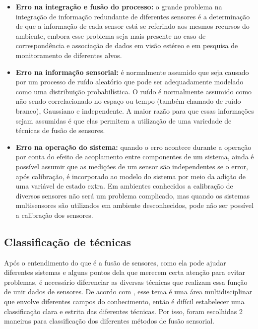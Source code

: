 \documentclass[acronym, symbols]{fei}
\begin{document}
			\begin{itemize}
				\item \textbf{Erro na integração e fusão do processo:} o grande problema na integração de informação redundante de diferentes sensores é a determinação de que a informação de cada sensor está se referindo aos mesmos recursos do ambiente, embora esse problema seja mais presente no caso de correspondência e associação de dados em visão estéreo e em pesquisa de monitoramento de diferentes alvos.
				
				\item \textbf{Erro na informação sensorial:} é normalmente assumido que seja causado por um processo de ruído aleatório que pode ser adequadamente modelado como uma distribuição probabilística. O ruído é normalmente assumido como não sendo correlacionado no espaço ou tempo (também chamado de ruído branco), Gaussiano e independente. A maior razão para que essas informações sejam assumidas é que elas permitem a utilização de uma variedade de técnicas de fusão de sensores.
				
				\item \textbf{Erro na operação do sistema:}  quando o erro acontece durante a operação por conta do efeito de acoplamento entre componentes de um sistema, ainda é possível assumir que as medições de um sensor são independentes se o error, após calibração, é incorporado ao modelo do sistema por meio da adição de uma variável de estado extra. Em ambientes conhecidos a calibração de diversos sensores não será um problema complicado, mas quando os sistemas multisensores são utilizados em ambiente desconhecidos, pode não ser possível a calibração dos sensores.
			\end{itemize}
		
		\subsection{Classificação de técnicas}
			Após o entendimento do que é a fusão de sensores, como ela pode ajudar diferentes sistemas e alguns pontos dela que merecem certa atenção para evitar problemas, é necessário diferenciar as diversas técnicas que realizam essa função de unir dados de sensores. De acordo com \textcite{castanedo2013review}, esse tema é uma área multidisciplinar que envolve diferentes campos do conhecimento, então é difícil estabelecer uma classificação clara e estrita das diferentes técnicas. Por isso, foram escolhidas 2 maneiras para classificação dos diferentes métodos de fusão sensorial.
			
\end{document}
